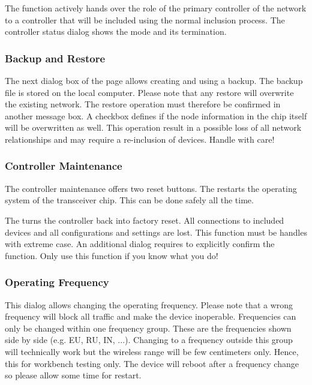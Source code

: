 The  function actively hands over the role of the primary controller 
of the network to a controller that will be included using the normal inclusion process. 
The controller status dialog shows the mode and its termination.


\subsubsection{Backup and Restore}
\label{BackupandRestore}

The next dialog  box of the page allows creating and using a backup.  The backup file is 
stored on the local computer. Please note that any restore will overwrite the existing 
network. The restore operation must therefore be confirmed in another message box. A 
checkbox defines if the node information in the \zwave chip itself will be overwritten 
as well. This operation result in a possible loss of all network relationships and may 
require a re-inclusion of devices. Handle with care!

\subsubsection{Controller Maintenance}

The controller maintenance offers two reset buttons. The  restarts 
the operating system of the \zwave transceiver chip. This can be done safely all the time.

The  turns the controller back into factory reset. All connections 
to included devices and all configurations and settings are lost. This function must be 
handles with extreme case. An additional dialog requires to explicitly confirm the 
function. Only use this function if you know what you do!

\subsubsection{Operating Frequency}


This dialog allows changing the operating frequency. Please note that a wrong frequency 
will block all \zwave traffic and make the device inoperable.  Frequencies can only be 
changed within one frequency group. These are the frequencies shown side by side (e.g. 
EU, RU, IN, ...). Changing to a frequency outside this group will technically work but 
the wireless range will be few centimeters only. Hence, this for workbench testing only. 
The device will reboot after a frequency change so please allow some time for restart.

